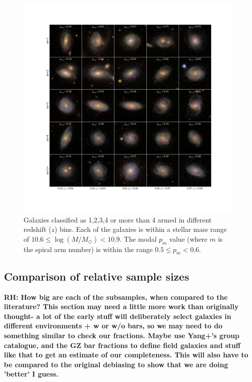 \documentclass[useAMS,usenatbib]{mn2e}
\newcommand{\rh}[1]{{\bf \textcolor{RoyalPurple}{RH: #1}}}
\begin{document}
\begin{figure}
		\centering
		
        \includegraphics[width=1\textwidth]{Data_imgs/image_panel.pdf}
		
        \caption{Galaxies classified as 1,2,3,4 or more than 4 armed in different redshift ($z$) bins. Each of the galaxies is within a stellar mass range of $10.6 \leq \log(M/M_{\odot}) < 10.9$. The modal $p_m$ value (where $m$ is the spiral arm number) is within the range $0.5 \leq p_m < 0.6$.}
		
        \label{fig:image_panel}
        
\end{figure}

\subsection{Comparison of relative sample sizes}

\rh{How big are each of the subsamples, when compared to the literature? This section may need a little more work than originally thought- a lot of the early stuff will deliberately select galaxies in different environments + w or w/o bars, so we may need to do something similar to check our fractions. Maybe use Yang+'s group catalogue, and the GZ bar fractions to define field galaxies and stuff like that to get an estimate of our completeness. This will also have to be compared to the original debiasing to show that we are doing 'better' I guess.}
\end{document}
